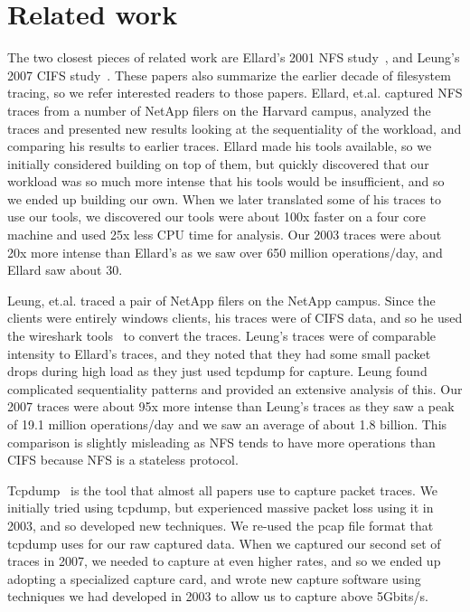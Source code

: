\section{Related work}
\label{sec:related}

The two closest pieces of related work are Ellard's 2001 NFS
study~\cite{EllardFast03}, and Leung's 2007 CIFS
study~\cite{LeungUsenix08}.  These papers also summarize the earlier
decade of filesystem tracing, so we refer interested readers to those
papers.  Ellard, et.al. captured NFS traces from a number of NetApp
filers on the Harvard campus, analyzed the traces and presented new
results looking at the sequentiality of the workload, and comparing
his results to earlier traces.  Ellard made his tools available, so we
initially considered building on top of them, but quickly discovered
that our workload was so much more intense that his tools would be
insufficient, and so we ended up building our own.  When we later
translated some of his traces to use our tools, we discovered our
tools were about 100x faster on a four core machine and used 25x less
CPU time for analysis.  Our 2003 traces were about 20x more intense
than Ellard's as we saw over 650 million operations/day, and Ellard
saw about 30.

Leung, et.al. traced a pair of NetApp filers on the NetApp campus.
Since the clients were entirely windows clients, his traces were of
CIFS data, and so he used the wireshark tools~\cite{wireshark} to
convert the traces.  Leung's traces were of comparable intensity to
Ellard's traces, and they noted that they had some small packet drops
during high load as they just used tcpdump for capture.  Leung found
complicated sequentiality patterns and provided an extensive analysis
of this.  Our 2007 traces were about 95x more intense than Leung's
traces as they saw a peak of 19.1 million operations/day and we saw an
average of about 1.8 billion.  This comparison is slightly misleading
as NFS tends to have more operations than CIFS because NFS is a
stateless protocol.

Tcpdump~\cite{tcpdump} is the tool that almost all papers use to capture packet
traces.  We initially tried using tcpdump, but experienced massive
packet loss using it in 2003, and so developed new techniques.  We
re-used the pcap file format that tcpdump uses for our raw captured
data.  When we captured our second set of traces in 2007, we needed to
capture at even higher rates, and so we ended up adopting a
specialized capture card, and wrote new capture software using
techniques we had developed in 2003 to allow us to capture above
5Gbits/s.

